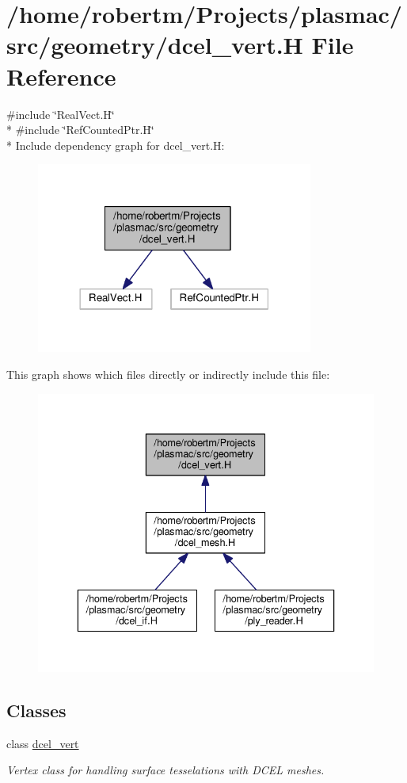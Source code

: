 \hypertarget{dcel__vert_8H}{}\section{/home/robertm/\+Projects/plasmac/src/geometry/dcel\+\_\+vert.H File Reference}
\label{dcel__vert_8H}
{\ttfamily \#include \char`\"{}Real\+Vect.\+H\char`\"{}}\\*
{\ttfamily \#include \char`\"{}Ref\+Counted\+Ptr.\+H\char`\"{}}\\*
Include dependency graph for dcel\+\_\+vert.\+H\+:\nopagebreak
\begin{figure}[H]
\begin{center}
\leavevmode
\includegraphics[width=258pt]{dcel__vert_8H__incl}
\end{center}
\end{figure}
This graph shows which files directly or indirectly include this file\+:\nopagebreak
\begin{figure}[H]
\begin{center}
\leavevmode
\includegraphics[width=336pt]{dcel__vert_8H__dep__incl}
\end{center}
\end{figure}
\subsection*{Classes}
\begin{DoxyCompactItemize}
\item 
class \hyperlink{classdcel__vert}{dcel\+\_\+vert}
\begin{DoxyCompactList}\small\item\em Vertex class for handling surface tesselations with D\+C\+EL meshes. \end{DoxyCompactList}\end{DoxyCompactItemize}
